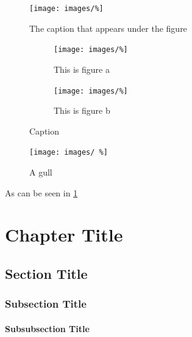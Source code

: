 \begin{figure}[H]
\centering
\texttt{[image: images/\%]}
\vskip10pt
\caption[The caption that appears in the list of figures]{The caption that appears under the figure}
\label{fig:exam}
\end{figure}

\begin{figure}[H]
\centering
\begin{subfigure}[t]{0.49\textwidth}
\centering
\texttt{[image: images/\%]}
\caption{This is figure a}
\label{fig:figureA}
\end{subfigure}
\begin{subfigure}[t]{0.49\textwidth}
\centering
\texttt{[image: images/\%]}
\caption{This is figure b}
\label{fig:figureB}
\end{subfigure}
\caption{Caption}
\end{figure}

\begin{figure}
\begin{center}
\texttt{[image: images/ \%]}
\end{center}
\caption{A gull}
\end{figure}

As can be seen in \cref{fig:exam}\\
\chapter{Chapter Title}
\label{ch:Chapter Title}

\section{Section Title}
\label{sec:Section Title}

\subsection{Subsection Title}
\label{subsec:Subsection Title}

\subsubsection{Subsubsection Title}
\label{bb:Subsubsection Title}






